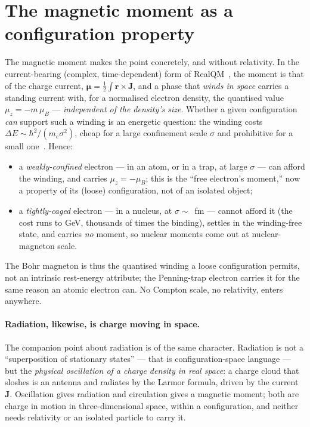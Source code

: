 \documentclass[11pt]{article}
\begin{document}
\section{The magnetic moment as a configuration property}
\label{sec:moment}

The magnetic moment makes the point concretely, and without relativity. In the current-bearing
(complex, time-dependent) form of RealQM~\cite{ComplexRealQM}, the moment is that of the charge current,
$\boldsymbol\mu = \tfrac12\int\mathbf r\times\mathbf J$, and a phase that \emph{winds in space} carries a
standing current with, for a normalised electron density, the quantised value $\mu_z = -m\,\mu_B$ ---
\emph{independent of the density's size}. Whether a given configuration \emph{can} support such a winding
is an energetic question: the winding costs $\Delta E \sim \hbar^2/(m_e\sigma^2)$, cheap for a large
confinement scale $\sigma$ and prohibitive for a small one~\cite{NuclearMoment}. Hence:
\begin{itemize}
\item a \emph{weakly-confined} electron --- in an atom, or in a trap, at large $\sigma$ --- can afford the
winding, and carries $\mu_z = -\mu_B$; this is the ``free electron's moment,'' now a property of its
(loose) configuration, not of an isolated object;
\item a \emph{tightly-caged} electron --- in a nucleus, at $\sigma\sim$~fm --- cannot afford it (the cost
runs to GeV, thousands of times the binding), settles in the winding-free state, and carries \emph{no}
moment, so nuclear moments come out at nuclear-magneton scale.
\end{itemize}
The Bohr magneton is thus the quantised winding a loose configuration permits, not an intrinsic
rest-energy attribute; the Penning-trap electron carries it for the same reason an atomic electron can.
No Compton scale, no relativity, enters anywhere.

\paragraph{Radiation, likewise, is charge moving in space.} The companion point about radiation is of the
same character. Radiation is not a ``superposition of stationary states'' --- that is configuration-space
language --- but the \emph{physical oscillation of a charge density in real space}: a charge cloud that
sloshes is an antenna and radiates by the Larmor formula, driven by the current $\mathbf J$. Oscillation
gives radiation and circulation gives a magnetic moment; both are charge in motion in three-dimensional
space, within a configuration, and neither needs relativity or an isolated particle to carry it.
\end{document}
